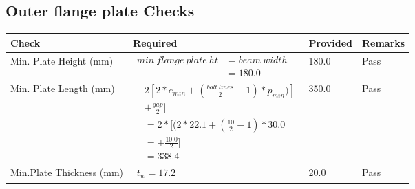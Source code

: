 \documentclass{article}%
\begin{document}
%
\newpage%
\subsection{Outer flange plate Checks}%
\label{subsec:OuterflangeplateChecks}%
\renewcommand{\arraystretch}{1.2}%
\begin{longtable}{|p{4cm}|p{6cm}|p{5.5cm}|p{1.5cm}|}%
\hline%
\rowcolor{OsdagGreen}%
Check&Required&Provided&Remarks\\%
\hline%
\endhead%
\hline%
Min. Plate Height (mm)&$\begin{aligned}min~flange~plate~ht &= beam~width\\ &=180.0\end{aligned}$&180.0&Pass\\%
\hline%
Min. Plate Length (mm)&$\begin{aligned} & 2[2*e_{min} + ({\frac{bolt~lines}{2}}-1) * p_{min})]\\ & +\frac{gap}{2}]\\ &=2*[(2*22.1 + (\frac{10}{2}-1) * 30.0\\ &= + \frac{10.0}{2}]\\ &=338.4\end{aligned}$&350.0&Pass\\%
\hline%
Min.Plate Thickness (mm)&$\begin{aligned} t_w=17.2\end{aligned}$&20.0&Pass\\%
\hline%
\end{longtable}

%
\newpage%
\end{document}

